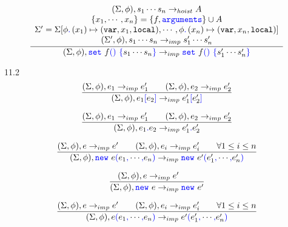 \documentclass[a4paper]{article}
\newcommand{\code}[1]{\textcolor{blue}{\tt #1}}
\newcommand{\mydot}{.\,}
\newcommand{\var}{{\tt{var}}}
\newcommand{\local}{{\tt{local}}}
\begin{document}
\begin{equation*}
\frac{
    \begin{array}{c}
    (\Sigma, \phi), s_1 \cdots s_n \rightarrow_{hoist} A \\
    \{ x_1, \cdots, x_n \} = \{ f, \code{arguments} \} \cup A \\
    \Sigma' = \Sigma [ \phi \code{\mydot} (x_1) \mapsto (\var, x_1, \local), \cdots, \phi \code{\mydot} (x_n) \mapsto (\var, x_n, \local) ] \\
    (\Sigma', \phi), s_1 \cdots s_n \rightarrow_{imp} s'_1 \cdots s'_n \\
    \end{array}
}{
    (\Sigma, \phi), \code{set}\ f \code{()}\ \code{\{} s_1 \cdots s_n \code{\}} \rightarrow_{imp} \code{set}\ f \code{()}\ \code{\{} s'_1 \cdots s'_n \code{\}}
}
\end{equation*}

11.2
\begin{equation*}
\frac{
    (\Sigma, \phi), e_1 \rightarrow_{imp} e'_1 \qquad
    (\Sigma, \phi), e_2 \rightarrow_{imp} e'_2
}{
    (\Sigma, \phi), e_1 \code{[} e_2 \code{]} \rightarrow_{imp} e'_1 \code{[} e'_2 \code{]}
}
\end{equation*}

\begin{equation*}
\frac{
    (\Sigma, \phi), e_1 \rightarrow_{imp} e'_1 \qquad
    (\Sigma, \phi), e_2 \rightarrow_{imp} e'_2
}{
    (\Sigma, \phi), e_1 \code{.} e_2 \rightarrow_{imp} e'_1 \code{.} e'_2
}
\end{equation*}

\begin{equation*}
\frac{
    (\Sigma, \phi), e \rightarrow_{imp} e' \qquad
    (\Sigma, \phi), e_i \rightarrow_{imp} e'_i \qquad \forall 1 \le i \le n
}{
    (\Sigma, \phi), \code{new}\ e \code{(} e_1 \code{,} \cdots \code{,} e_n \code{)} \rightarrow_{imp} \code{new}\ e' \code{(} e'_1 \code{,} \cdots \code{,} e'_n \code{)}
}
\end{equation*}

\begin{equation*}
\frac{
    (\Sigma, \phi), e \rightarrow_{imp} e' \qquad
}{
    (\Sigma, \phi), \code{new}\ e \rightarrow_{imp} \code{new}\ e'
}
\end{equation*}

\begin{equation*}
\frac{
    (\Sigma, \phi), e \rightarrow_{imp} e' \qquad
    (\Sigma, \phi), e_i \rightarrow_{imp} e'_i \qquad \forall 1 \le i \le n
}{
    (\Sigma, \phi), e \code{(} e_1 \code{,} \cdots \code{,} e_n \code{)} \rightarrow_{imp} e' \code{(} e'_1 \code{,} \cdots \code{,} e'_n \code{)}
}
\end{equation*}
\end{document}
